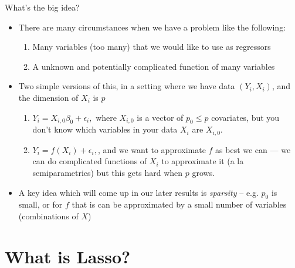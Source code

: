      \begin{frame}[allowframebreaks]{What's the big idea?}
      \begin{itemize}
        \item There are many circumstances when we have a problem like the following:
          \begin{enumerate}
          \item Many variables (too many) that we would like to use as regressors
          \item A unknown and potentially complicated function of many variables
          \end{enumerate}
        \item Two simple versions of this, in a setting where we have data
          $(Y_{i}, X_{i})$, and the dimension of $X_{i}$ is $p$
          \begin{enumerate}
          \item $Y_{i} = X_{i,0}\beta_{0} + \epsilon_{i},$ where $X_{i,0}$ is a
            vector of $p_{0} \leq p$ covariates, but you don't
            know which variables in your data $X_{i}$ are $X_{i,0}$. 
          \item $Y_{i} = f(X_{i}) + \epsilon_{i},$, and we want to
            approximate $f$ as best we can --- we can do complicated
            functions of $X_{i}$ to approximate it (a la semiparametrics)
            but this gets hard when $p$ grows.
          \end{enumerate}
          \item A key idea which will come up in our later results is
            \emph{sparsity} -- e.g. $p_{0}$ is small, or for $f$ that is can
            be approximated by a small number of variables (combinations of
            $X$)
        \end{itemize}
      \end{frame}
      
      \section{What is Lasso?}
      \frame{\sectionpage}

